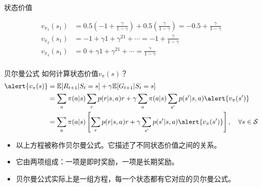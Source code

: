 \documentclass[aspectratio=169,xcolor=dvipsnames]{beamer}
\begin{document}
\begin{frame}{状态价值}
\begin{center}
    \end{center}
    \[
        \begin{aligned}
            v_{\pi_1}(s_1)&=0.5\left(-1+\frac{\gamma}{1-\gamma}\right)+0.5\left(\frac{\gamma}{1-\gamma}\right) = -0.5+\frac{\gamma}{1-\gamma}\\
            v_{\pi_2}(s_1)&=-1+\gamma1+\gamma^21+\cdots=-1+\frac{\gamma}{1-\gamma}\\
            v_{\pi_3}(s_1)&=0+\gamma1+\gamma^21+\cdots=\frac{\gamma}{1-\gamma} \\            
        \end{aligned}
    \]
\end{frame}

\begin{frame}{贝尔曼公式}
    如何计算状态价值$v_{\pi}(s)$？
    \[
        \begin{aligned}
            \alert{v_\pi(s)}&=\mathbb{E}[R_{t+1}|S_t=s]+\gamma\mathbb{E}[G_{t+1}|S_t=s] \\
            &=\sum_a\pi(a|s)\sum_r p(r|s,a)r+\gamma\sum_a\pi(a|s)\sum_{s'}p(s'|s,a)\alert{v_{\pi}(s')} \\
            &=\sum_a\pi(a|s)\left[\sum_r p(r|s,a)r+\gamma\sum_{s'}p(s'|s,a)\alert{v_{\pi}(s')}\right], \quad \forall s\in\mathcal{S}
        \end{aligned}
    \]
    \begin{itemize}
        \item 以上方程被称作贝尔曼公式。它描述了不同状态价值之间的关系。
        \item 它由两项组成：一项是即时奖励，一项是长期奖励。
        \item 贝尔曼公式实际上是一组方程，每一个状态都有它对应的贝尔曼公式。
    \end{itemize}
\end{frame}
\end{document}
